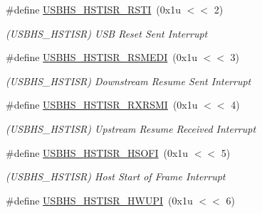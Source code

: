 \begin{DoxyCompactItemize}
\mbox{\label{group__SAMS70__USBHS_gaf84113b919c558bfeb00a82f0b34ceaa}} 
\#define \mbox{\hyperlink{group__SAMS70__USBHS_gaf84113b919c558bfeb00a82f0b34ceaa}{U\+S\+B\+H\+S\+\_\+\+H\+S\+T\+I\+S\+R\+\_\+\+R\+S\+TI}}~(0x1u $<$$<$ 2)
\begin{DoxyCompactList}\small\item\em (U\+S\+B\+H\+S\+\_\+\+H\+S\+T\+I\+SR) U\+SB Reset Sent Interrupt \end{DoxyCompactList}\item 
\mbox{\label{group__SAMS70__USBHS_ga09c9fce8f7ee07463c038713026e71a3}} 
\#define \mbox{\hyperlink{group__SAMS70__USBHS_ga09c9fce8f7ee07463c038713026e71a3}{U\+S\+B\+H\+S\+\_\+\+H\+S\+T\+I\+S\+R\+\_\+\+R\+S\+M\+E\+DI}}~(0x1u $<$$<$ 3)
\begin{DoxyCompactList}\small\item\em (U\+S\+B\+H\+S\+\_\+\+H\+S\+T\+I\+SR) Downstream Resume Sent Interrupt \end{DoxyCompactList}\item 
\mbox{\label{group__SAMS70__USBHS_gab6e204fe65d4c73c987271638fcdfdb6}} 
\#define \mbox{\hyperlink{group__SAMS70__USBHS_gab6e204fe65d4c73c987271638fcdfdb6}{U\+S\+B\+H\+S\+\_\+\+H\+S\+T\+I\+S\+R\+\_\+\+R\+X\+R\+S\+MI}}~(0x1u $<$$<$ 4)
\begin{DoxyCompactList}\small\item\em (U\+S\+B\+H\+S\+\_\+\+H\+S\+T\+I\+SR) Upstream Resume Received Interrupt \end{DoxyCompactList}\item 
\mbox{\label{group__SAMS70__USBHS_ga2e72394c9c97ef664be053cbd2c76bc5}} 
\#define \mbox{\hyperlink{group__SAMS70__USBHS_ga2e72394c9c97ef664be053cbd2c76bc5}{U\+S\+B\+H\+S\+\_\+\+H\+S\+T\+I\+S\+R\+\_\+\+H\+S\+O\+FI}}~(0x1u $<$$<$ 5)
\begin{DoxyCompactList}\small\item\em (U\+S\+B\+H\+S\+\_\+\+H\+S\+T\+I\+SR) Host Start of Frame Interrupt \end{DoxyCompactList}\item 
\mbox{\label{group__SAMS70__USBHS_gafbd5ce141cbeda44deeeb8803154192b}} 
\#define \mbox{\hyperlink{group__SAMS70__USBHS_gafbd5ce141cbeda44deeeb8803154192b}{U\+S\+B\+H\+S\+\_\+\+H\+S\+T\+I\+S\+R\+\_\+\+H\+W\+U\+PI}}~(0x1u $<$$<$ 6)
$$
\end{DoxyCompactItemize}

